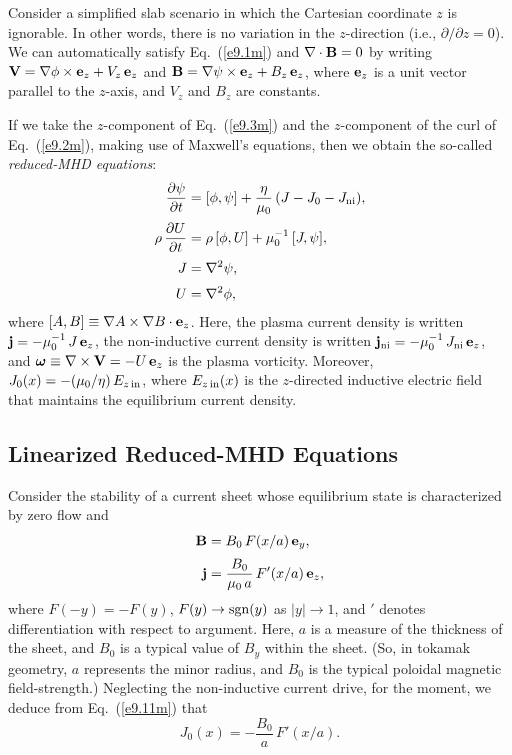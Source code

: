 \documentclass[12pt,prb,aps]{revtex4-1}
\newcommand{\bomega}{\mbox{\boldmath$\omega$}}
\begin{document}
Consider a simplified slab scenario in which the Cartesian coordinate $z$ is ignorable. In other words, there is
no variation in the $z$-direction (i.e., $\partial/\partial z=0$). We can automatically satisfy Eq.~(\ref{e9.1m})
and $\nabla\cdot{\bf B} = 0$ by writing
${\bf V} =\nabla\phi\times {\bf e}_z + V_z\,{\bf e}_z$ and 
${\bf B} = \nabla\psi\times{\bf e}_z + B_z\,{\bf e}_z$,
where ${\bf e}_z$ is a unit vector parallel to the $z$-axis, and $V_z$ and $B_z$  are constants.  

If we take the $z$-component of Eq.~(\ref{e9.3m}) and the $z$-component of the curl of Eq.~(\ref{e9.2m}), making use of Maxwell's equations,
then we obtain the  so-called {\em reduced-MHD equations}:\,\cite{strauss}
\begin{align}
\frac{\partial\psi}{\partial t} &= [\phi,\psi]+\frac{\eta}{\mu_0}\,(J-J_0-J_{\rm ni}),\label{e9.11m}\\[0.5ex]
\rho\,\frac{\partial U}{\partial t} &= \rho\,[\phi,U] + \mu_0^{-1}\,[J,\psi],\\[0.5ex]
J&=\nabla^2\psi,\\[0.5ex]
U&=\nabla^2\phi,\label{e9.14m}
\end{align}
where $[A,B]\equiv \nabla A\times \nabla B\cdot{\bf e}_z$. Here, the plasma current density
is written ${\bf j} = -\mu_0^{-1}\,J\,{\bf e}_z$, the  non-inductive current density is written ${\bf j}_{\rm ni} = -\mu_0^{-1}\,J_{\rm ni}\, {\bf e}_z$, 
 and $\bomega\equiv \nabla\times{\bf V}=-U\,{\bf e}_z$ is the plasma vorticity. 
Moreover, $J_0(x)=-(\mu_0/\eta)\,E_{z\,{\rm in}}$, where $E_{z\,{\rm in}}(x)$ is  the $z$-directed inductive electric field that maintains the equilibrium current density.

\subsection{Linearized Reduced-MHD Equations}
Consider the stability of a current sheet whose equilibrium state is characterized by zero flow and 
\begin{align}
{\bf B}&= B_0\,F(x/a)\,{\bf e}_y,\\[0.5ex]
{\bf j}&= \frac{B_0}{\mu_0\,a}\,F'(x/a)\,{\bf e}_z,
\end{align}
where $F(-y)= - F(y)$, $F(y)\rightarrow {\rm sgn}(y)$ as $|y|\rightarrow 1$, and $'$ denotes differentiation with
respect to argument.  Here, $a$ is a measure of the thickness of the sheet, and $B_0$ is a typical value of $B_y$ within the sheet.   (So, in tokamak geometry, $a$ represents the minor radius, and $B_0$ is the typical
poloidal magnetic field-strength.) Neglecting the non-inductive current
drive, for the moment, 
 we  deduce from Eq.~(\ref{e9.11m}) that
\begin{equation}
J_0(x) = - \frac{B_0}{a}\,F'(x/a).
\end{equation}
\end{document}
